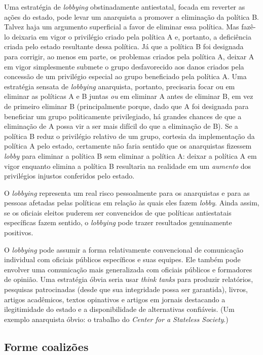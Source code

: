 Uma estratégia de \emph{lobbying} obstinadamente antiestatal, focada em reverter as ações do estado, pode levar um anarquista a promover a eliminação da política B. Talvez haja um argumento superficial a favor de eliminar essa política. Mas fazê-lo deixaria em vigor o privilégio criado pela política A e, portanto, a deficiência criada pelo estado resultante dessa política. Já que a política B foi designada para corrigir, ao menos em parte, os problemas criados pela política A, deixar A em vigor simplesmente submete o grupo desfavorecido aos danos criados pela concessão de um privilégio especial ao grupo beneficiado pela política A. Uma estratégia sensata de \emph{lobbying} anarquista, portanto, precisaria focar ou em eliminar as políticas A e B juntas \emph{ou} em eliminar A antes de eliminar B, em vez de primeiro eliminar B (principalmente porque, dado que A foi designada para beneficiar um grupo politicamente privilegiado, há grandes chances de que a eliminação de A possa vir a ser mais difícil do que a eliminação de B). Se a política B reduz o privilégio relativo de um grupo, cortesia da implementação da política A pelo estado, certamente não faria sentido que os anarquistas fizessem \emph{lobby} para eliminar a política B sem eliminar a política A: deixar a política A em vigor enquanto elimina a política B resultaria na realidade em um \emph{aumento} dos privilégios injustos conferidos pelo estado.

O \emph{lobbying} representa um real risco pessoalmente para os anarquistas e para as pessoas afetadas pelas políticas em relação às quais eles fazem \emph{lobby}. Ainda assim, se os oficiais eleitos puderem ser convencidos de que políticas antiestatais específicas fazem sentido, o \emph{lobbying} pode trazer resultados genuinamente positivos.

O \emph{lobbying} pode assumir a forma relativamente convencional de comunicação individual com oficiais públicos específicos e suas equipes. Ele também pode envolver uma comunicação mais generalizada com oficiais públicos e formadores de opinião. Uma estratégia óbvia seria usar \emph{think tanks} para produzir relatórios, pesquisas patrocinadas (desde que sua integridade possa ser garantida), livros, artigos acadêmicos, textos opinativos e artigos em jornais destacando a ilegitimidade do estado e a disponibilidade de alternativas confiáveis. (Um exemplo anarquista óbvio: o trabalho do \emph{Center for a Stateless Society}.)

\subsection*{Forme coalizões}

